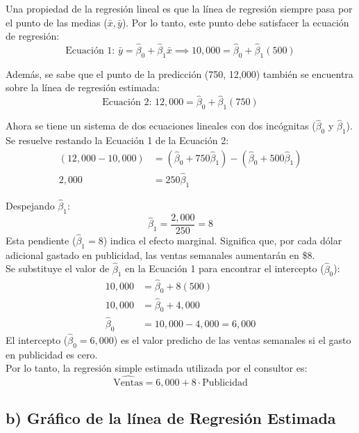\documentclass[12pt]{article}
\begin{document}
Una propiedad de la regresión lineal es que la línea de regresión siempre pasa por el punto de las medias ($\bar{x}, \bar{y}$). Por lo tanto, este punto debe satisfacer la ecuación de regresión:
\begin{equation*}
\text{Ecuación 1: } \bar{y} = \hat{\beta}_0 + \hat{\beta}_1 \bar{x} \implies 10,000 = \hat{\beta}_0 + \hat{\beta}_1(500)
\end{equation*}

Además, se sabe que el punto de la predicción (750, 12,000) también se encuentra sobre la línea de regresión estimada:
\begin{equation*}
\text{Ecuación 2: } 12,000 = \hat{\beta}_0 + \hat{\beta}_1(750)
\end{equation*}

Ahora se tiene un sistema de dos ecuaciones lineales con dos incógnitas ($\hat{\beta}_0$ y $\hat{\beta}_1$). Se resuelve restando la Ecuación 1 de la Ecuación 2:
\begin{align*}
(12,000 - 10,000) &= (\hat{\beta}_0 + 750\hat{\beta}_1) - (\hat{\beta}_0 + 500\hat{\beta}_1) \\
2,000 &= 250\hat{\beta}_1
\end{align*}

Despejando $\hat{\beta}_1$:
$$
\hat{\beta}_1 = \frac{2,000}{250} = 8
$$
Esta pendiente ($\hat{\beta}_1 = 8$) indica el efecto marginal. Significa que, por cada dólar adicional gastado en publicidad, las ventas semanales aumentarán en \$8.\\

Se substituye el valor de $\hat{\beta}_1$ en la Ecuación 1 para encontrar el intercepto ($\hat{\beta}_0$):
\begin{align*}
10,000 &= \hat{\beta}_0 + 8(500) \\
10,000 &= \hat{\beta}_0 + 4,000 \\
\hat{\beta}_0 &= 10,000 - 4,000 = 6,000
\end{align*}
El intercepto ($\hat{\beta}_0 = 6,000$) es el valor predicho de las ventas semanales si el gasto en publicidad es cero.\\

Por lo tanto, la regresión simple estimada utilizada por el consultor es:
$$
\hat{\text{Ventas}} = 6,000 + 8 \cdot \text{Publicidad}
$$

\subsection*{b) Gráfico de la línea de Regresión Estimada}
\end{document}
